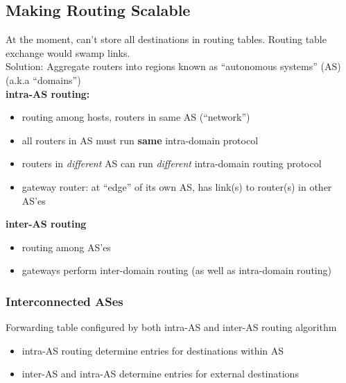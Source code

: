 \subsection{Making Routing Scalable}
At the moment, can't store all destinations in routing tables. Routing table exchange would swamp links.\\
Solution: Aggregate routers into regions known as ``autonomous systems'' (AS) (a.k.a ``domains'')\\
\textbf{intra-AS routing:}
\begin{itemize}
	\item routing among hosts, routers in same AS (``network'')
	\item all routers in AS must run \textbf{same} intra-domain protocol
	\item routers in \textit{different} AS can run \textit{different} intra-domain routing protocol
	\item gateway router: at ``edge'' of its own AS, has link(s) to router(s) in other AS'es
\end{itemize}
\textbf{inter-AS routing}
\begin{itemize}
	\item routing among AS'es
	\item gateways perform inter-domain routing (as well as intra-domain routing)
\end{itemize}
\subsubsection{Interconnected ASes}
Forwarding table configured by both intra-AS and inter-AS routing algorithm
\begin{itemize}
	\item intra-AS routing determine entries for destinations within AS
	\item inter-AS and intra-AS determine entries for external destinations
\end{itemize}
